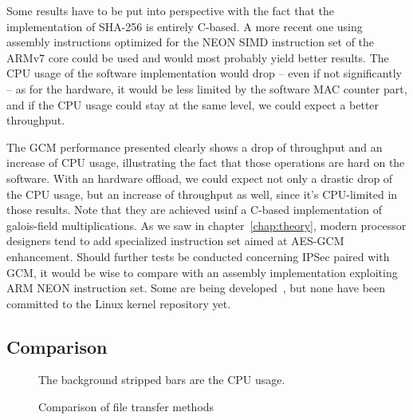 Some results have to be put into perspective with the fact that the implementation of SHA-256 is entirely C-based.
A more recent one using assembly instructions optimized for the NEON SIMD instruction set of the ARMv7 core could be used and would most probably yield better results.
The CPU usage of the software implementation would drop -- even if not significantly -- as for the hardware, it would be less limited by the software MAC counter part, and if the CPU usage could stay at the same level, we could expect a better throughput.

The GCM performance presented clearly shows a drop of throughput and an increase of CPU usage, illustrating the fact that those operations are hard on the software.
With an hardware offload, we could expect not only a drastic drop of the CPU usage, but an increase of throughput as well, since it's CPU-limited in those results.
Note that they are achieved usinf a C-based implementation of galois-field multiplications.
As we saw in chapter~\ref{chap:theory}, modern processor designers tend to add specialized instruction set aimed at AES-GCM enhancement.
Should further tests be conducted concerning IPSec paired with GCM, it would be wise to compare with an assembly implementation exploiting ARM NEON instruction set.
Some are being developed~\cite{Conrado2013,Danilo2013}, but none have been committed to the Linux kernel repository yet.

\subsection{Comparison}

\begin{figure}[ht]

\caption{Comparison of file transfer methods}{The background stripped bars are the CPU usage.}
\label{fig:ftp-bench-comparison}
\end{figure}